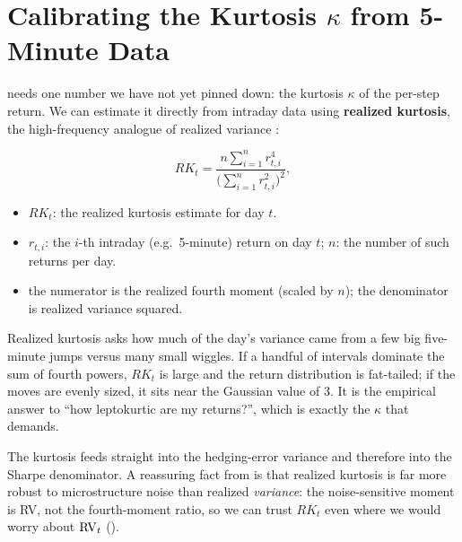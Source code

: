 \section{Calibrating the Kurtosis $\kappa$ from 5-Minute Data}
\label{sec:ivrv:kurtosis}

 needs one number we have not yet pinned down: the kurtosis $\kappa$ of the per-step return. We can estimate it directly from intraday data using \textbf{realized kurtosis}, the high-frequency analogue of realized variance \citep{AmayaEtAl2015}:

\begin{equation}
\label{eq:ivrv:realized-kurtosis}
RK_t = \frac{n\sum_{i=1}^{n} r_{t,i}^4}{\Big(\sum_{i=1}^{n} r_{t,i}^2\Big)^2},
\end{equation}
\begin{itemize}
  \item $RK_t$: the realized kurtosis estimate for day $t$.
  \item $r_{t,i}$: the $i$-th intraday (e.g.\ 5-minute) return on day $t$; $n$: the number of such returns per day.
  \item the numerator is the realized fourth moment (scaled by $n$); the denominator is realized variance squared.
\end{itemize}

\begin{intuition}
Realized kurtosis asks how much of the day's variance came from a few big five-minute jumps versus many small wiggles. If a handful of intervals dominate the sum of fourth powers, $RK_t$ is large and the return distribution is fat-tailed; if the moves are evenly sized, it sits near the Gaussian value of $3$. It is the empirical answer to ``how leptokurtic are my returns?'', which is exactly the $\kappa$ that  demands.
\end{intuition}

\begin{projectconnection}
The kurtosis feeds straight into the hedging-error variance and therefore into the Sharpe denominator. A reassuring fact from \citet{AmayaEtAl2015} is that realized kurtosis is far more robust to microstructure noise than realized \emph{variance}: the noise-sensitive moment is RV, not the fourth-moment ratio, so we can trust $RK_t$ even where we would worry about $\operatorname{RV}_t$ ().
\end{projectconnection}

